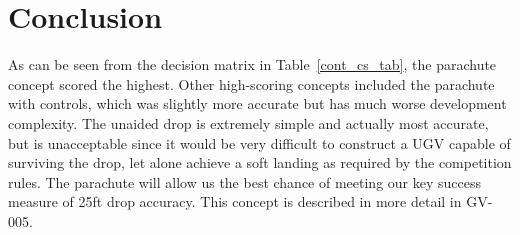 \documentclass[]{auvsi_doc}
\begin{document}
\section{Conclusion}
As can be seen from the decision matrix in Table~\ref{cont_cs_tab}, the parachute concept scored the highest. Other high-scoring concepts included the parachute with controls, which was slightly more accurate but has much worse development complexity. The unaided drop is extremely simple and actually most accurate, but is unacceptable since it would be very difficult to construct a UGV capable of surviving the drop, let alone achieve a soft landing as required by the competition rules. The parachute will allow us the best chance of meeting our key success measure of 25ft drop accuracy. This concept is described in more detail in GV-005.
\end{document}
